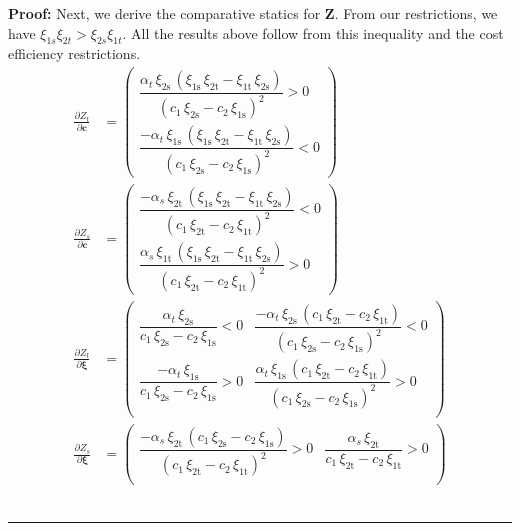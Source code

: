 \documentclass[11pt,a4paper,leqno]{extarticle}
\newenvironment{proof}[1][Proof]{\noindent\textbf{#1:} }{\ \rule{0.5em}{0.5em}}
\begin{document}
\begin{proof}
		Next, we derive the comparative statics for $\mathbf{Z}$. From our restrictions, we have $\xi_{1s}\xi_{2t} > \xi_{2s}\xi_{1t}$. All the results above follow from this inequality and the cost efficiency restrictions. 
		\begin{align*}
		\frac{\partial Z_t}{\partial \mathbf{c}} &= 
		\begin{pmatrix}
		\dfrac{\alpha _{t}\,\xi _{\mathrm{2s}}\,\left(\xi _{\mathrm{1s}}\,\xi _{\mathrm{2t}}-\xi _{\mathrm{1t}}\,\xi _{\mathrm{2s}}\right)}{{\left(c_{1}\,\xi _{\mathrm{2s}}-c_{2}\,\xi _{\mathrm{1s}}\right)}^2}>0\\
		\dfrac{-\alpha _{t}\,\xi _{\mathrm{1s}}\,\left(\xi _{\mathrm{1s}}\,\xi _{\mathrm{2t}}-\xi _{\mathrm{1t}}\,\xi _{\mathrm{2s}}\right)}{{\left(c_{1}\,\xi _{\mathrm{2s}}-c_{2}\,\xi _{\mathrm{1s}}\right)}^2}<0
		\end{pmatrix}\\
		\frac{\partial Z_s}{\partial \mathbf{c}} &= 
		\begin{pmatrix}
		\dfrac{-\alpha _{s}\,\xi _{\mathrm{2t}}\,\left(\xi _{\mathrm{1s}}\,\xi _{\mathrm{2t}}-\xi _{\mathrm{1t}}\,\xi _{\mathrm{2s}}\right)}{{\left(c_{1}\,\xi _{\mathrm{2t}}-c_{2}\,\xi _{\mathrm{1t}}\right)}^2} <0\\
		\dfrac{\alpha _{s}\,\xi _{\mathrm{1t}}\,\left(\xi _{\mathrm{1s}}\,\xi _{\mathrm{2t}}-\xi _{\mathrm{1t}}\,\xi _{\mathrm{2s}}\right)}{{\left(c_{1}\,\xi _{\mathrm{2t}}-c_{2}\,\xi _{\mathrm{1t}}\right)}^2} >0
		\end{pmatrix}\\
		\frac{\partial Z_t}{\partial \boldsymbol{\xi}} &= 
		\begin{pmatrix}
		\dfrac{\alpha _{t}\,\xi _{\mathrm{2s}}}{c_{1}\,\xi _{\mathrm{2s}}-c_{2}\,\xi _{\mathrm{1s}}} < 0& \dfrac{-\alpha _{t}\,\xi _{\mathrm{2s}}\,\left(c_{1}\,\xi _{\mathrm{2t}}-c_{2}\,\xi _{\mathrm{1t}}\right)}{{\left(c_{1}\,\xi _{\mathrm{2s}}-c_{2}\,\xi _{\mathrm{1s}}\right)}^2} <0 \\
		\dfrac{-\alpha _{t}\,\xi _{\mathrm{1s}}}{c_{1}\,\xi _{\mathrm{2s}}-c_{2}\,\xi _{\mathrm{1s}}} >0& \dfrac{\alpha _{t}\,\xi _{\mathrm{1s}}\,\left(c_{1}\,\xi _{\mathrm{2t}}-c_{2}\,\xi _{\mathrm{1t}}\right)}{{\left(c_{1}\,\xi _{\mathrm{2s}}-c_{2}\,\xi _{\mathrm{1s}}\right)}^2} >0\\
		\end{pmatrix}\\
		\frac{\partial Z_s}{\partial \boldsymbol{\xi}} &= 
		\begin{pmatrix}
		\dfrac{-\alpha _{s}\,\xi _{\mathrm{2t}}\,\left(c_{1}\,\xi _{\mathrm{2s}}-c_{2}\,\xi _{\mathrm{1s}}\right)}{{\left(c_{1}\,\xi _{\mathrm{2t}}-c_{2}\,\xi _{\mathrm{1t}}\right)}^2}> 0& \dfrac{\alpha _{s}\,\xi _{\mathrm{2t}}}{c_{1}\,\xi _{\mathrm{2t}}-c_{2}\,\xi _{\mathrm{1t}}} > 0\\

\end{pmatrix}
\end{align*}
\end{proof}
\end{document}
